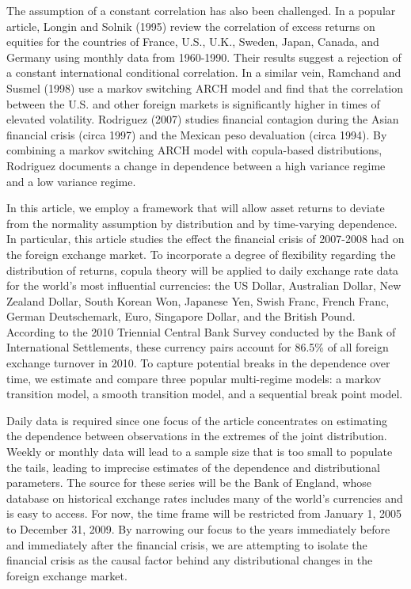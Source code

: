 \documentclass[12pt]{article}
\begin{document}
The assumption of a constant correlation has also been challenged. In a
popular article, Longin and Solnik (1995) review the correlation of excess
returns on equities for the countries of France, U.S., U.K., Sweden, Japan,
Canada, and Germany using monthly data from 1960-1990. Their results suggest
a rejection of a constant international conditional correlation. In a similar
vein, Ramchand and Susmel (1998) use a markov switching ARCH model and find
that the correlation between the U.S. and other foreign markets is
significantly higher in times of elevated volatility. Rodriguez (2007) studies
financial contagion during the Asian financial crisis (circa 1997) and the
Mexican peso devaluation (circa 1994). By combining a markov switching ARCH
model with copula-based distributions, Rodriguez documents a change in
dependence between a high variance regime and a low variance regime.

In this article, we employ a framework that will allow asset returns to
deviate from the normality assumption by distribution and by time-varying
dependence. In particular, this article studies the effect the financial
crisis of 2007-2008 had on the foreign exchange market. To incorporate a
degree of flexibility regarding the distribution of returns, copula theory
will be applied to daily exchange rate data for the world's most influential 
currencies: the US Dollar, Australian Dollar, New Zealand Dollar, South Korean Won,
Japanese Yen, Swish Franc, French Franc, German Deutschemark, Euro,
Singapore Dollar, and the British Pound. According to the 2010 Triennial Central
Bank Survey conducted by the Bank of International Settlements, these
currency pairs account for 86.5\% of all foreign exchange turnover in 2010.
To capture potential breaks in the dependence over time, we estimate and
compare three popular multi-regime models: a markov transition model, a
smooth transition model, and a sequential break point model.

Daily data is required since one focus of the article concentrates on
estimating the dependence between observations in the extremes of the joint
distribution. Weekly or monthly data will lead to a sample size that is too
small to populate the tails, leading to imprecise estimates of the dependence
and distributional parameters. The source for these series will be the
Bank of England, whose database on historical exchange rates includes many
of the world's currencies and is easy to access. For now, the time frame
will be restricted from January 1, 2005 to December 31, 2009. By narrowing
our focus to the years immediately before and immediately after the financial
crisis, we are attempting to isolate the financial crisis as the causal
factor behind any distributional changes in the foreign exchange market.
\end{document}
